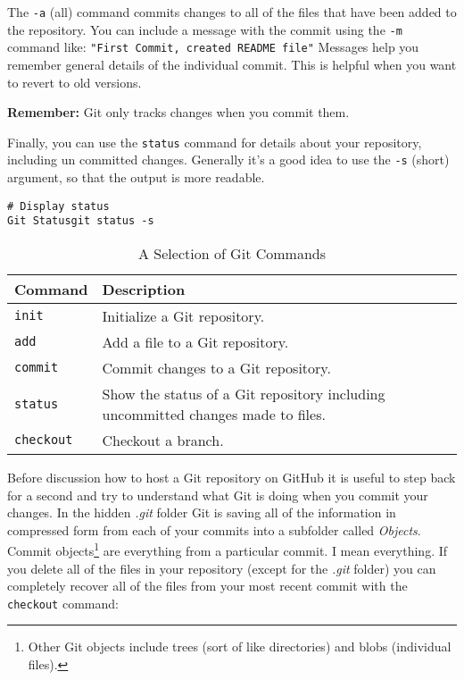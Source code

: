 \nodindent The \texttt{-a} (all) command commits changes to all of the files that have been added to the repository. You can include a message with the commit using the \texttt{-m} command like: \texttt{"First Commit, created README file"} Messages help you remember general details of the individual commit. This is helpful when you want to revert to old versions.

\noindent \textbf{Remember:} Git only tracks changes when you commit them. 

Finally, you can use the \texttt{status} command for details about your repository, including un committed changes. Generally it's a good idea to use the \texttt{-s} (short) argument, so that the output is more readable.

\begin{knitrout}
\color{fgcolor}\begin{kframe}
\begin{verbatim}
# Display status
Git Statusgit status -s
\end{verbatim}
\end{kframe}
\end{knitrout}


\begin{table}
  \caption{A Selection of Git Commands}
  \begin{center}
  \label{GitCommandsTable}
  \begin{tabular}{l p{5cm}}
    \hline  
    Command & Description \\[0.25cm] \hline\hline
    \texttt{init} & Initialize a Git repository. \\[0.25cm]
    \texttt{add} & Add a file to a Git repository. \\[0.25cm]
    \texttt{commit} & Commit changes to a Git repository. \\[0.25cm]
    \texttt{status} & Show the status of a Git repository including uncommitted changes made to files. \\[0.25cm]
    \texttt{checkout} & Checkout a branch. \\[0.25cm]
    \hline
  \end{tabular}
  \end{center}
\end{table}

Before discussion how to host a Git repository on GitHub it is useful to step back for a second and try to understand what Git is doing when you commit your changes. In the hidden {\emph{.git}} folder Git is saving all of the information in compressed form from each of your commits into a subfolder called {\emph{Objects}}. Commit objects\footnote{Other Git objects include trees (sort of like directories) and blobs (individual files).} are everything from a particular commit. I mean everything. If you delete all of the files in your repository (except for the {\emph{.git}} folder) you can completely recover all of the files from your most recent commit with the \texttt{checkout} command:

